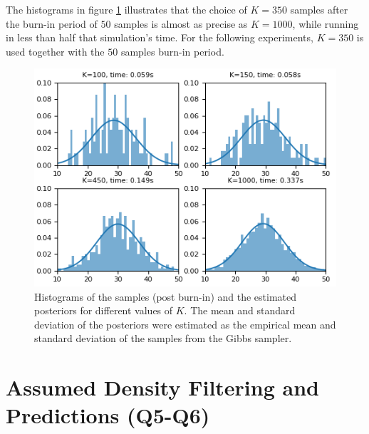 \documentclass{article}
\begin{document}
	The histograms in figure \ref{fig:q_4_2} illustrates that the choice of $K=350$ samples after the burn-in period of $50$ samples is almost as precise as $K=1000$, while running in less than half that simulation's time. For the following experiments, $K=350$ is used together with the $50$ samples burn-in period.
	
	\begin{figure}[t]
		\centering
		\includegraphics[width=0.7\linewidth]{q_4_2}
		\caption{Histograms of the samples (post burn-in) and the estimated posteriors for different values of $K$. The mean and standard deviation of the posteriors were estimated as the empirical mean and standard deviation of the samples from the Gibbs sampler.}
		\label{fig:q_4_2}
	\end{figure}
	
	
	
	\section{Assumed Density Filtering and Predictions (Q5-Q6)}
	
\end{document}
